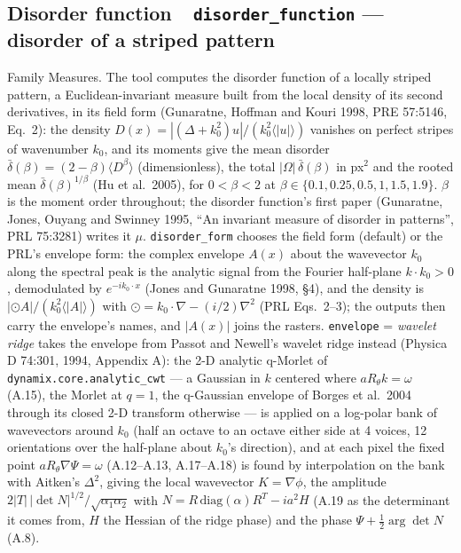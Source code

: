 \documentclass[10pt]{article}
\newcommand{\dev}[1]{\texttt{#1}}
\newcommand{\tool}[2]{#1~\textperiodcentered~\dev{#2}}
\begin{document}
\subsection{\tool{Disorder function}{disorder\_function} --- disorder of a striped pattern}\label{sec:disorder-function}
Family Measures. The tool computes the
disorder function of a locally striped pattern, a Euclidean-invariant measure built from the
local density of its second derivatives, in its field form
(Gunaratne, Hoffman and Kouri 1998, PRE 57:5146, Eq.~2): the density
$D(x) = |(\Delta + k_0^2)u| / (k_0^2 \langle|u|\rangle)$ vanishes on perfect stripes of wavenumber
$k_0$, and its moments give the mean disorder $\bar\delta(\beta) = (2-\beta)\langle D^\beta\rangle$
(dimensionless), the total $|\Omega|\,\bar\delta(\beta)$ in px$^2$ and the rooted mean
$\bar\delta(\beta)^{1/\beta}$ (Hu et al.\ 2005), for $0 < \beta < 2$ at
$\beta \in \{0.1, 0.25, 0.5, 1, 1.5, 1.9\}$. $\beta$ is the moment order
throughout; the disorder function's first paper (Gunaratne, Jones, Ouyang and Swinney 1995, ``An
invariant measure of disorder in patterns'', PRL 75:3281) writes it $\mu$. \texttt{disorder\_form} chooses the field form (default)
or the PRL's envelope form: the complex envelope $A(x)$ about the wavevector $k_0$ along the
spectral peak is the analytic signal from the Fourier half-plane $k\cdot k_0 > 0$, demodulated by
$e^{-ik_0\cdot x}$ (Jones and Gunaratne 1998, \S4), and the density is $|\odot A| / (k_0^2
\langle|A|\rangle)$ with $\odot = k_0\cdot\nabla - (i/2)\nabla^2$ (PRL Eqs.~2--3); the outputs then
carry the envelope's names, and $|A(x)|$ joins the rasters. \texttt{envelope} = \emph{wavelet
ridge} takes the envelope from Passot and Newell's wavelet ridge instead (Physica D 74:301, 1994,
Appendix A): the 2-D analytic q-Morlet of \texttt{dynamix.core.analytic\_cwt} --- a Gaussian in $k$
centered where $aR_\theta k = \omega$ (A.15), the Morlet at $q = 1$, the q-Gaussian envelope of
Borges et al.\ 2004 through its closed 2-D transform otherwise --- is applied on a log-polar bank
of wavevectors around $k_0$ (half an octave to an octave either side at 4 voices, 12 orientations
over the half-plane about $k_0$'s direction), and at each pixel the fixed point $aR_\theta\nabla\Psi
= \omega$ (A.12--A.13, A.17--A.18) is found by interpolation on the bank with Aitken's $\Delta^2$,
giving the local wavevector $K = \nabla\phi$, the amplitude $2|T|\,|\det N|^{1/2}/\sqrt{\alpha_1
\alpha_2}$ with $N = R\,\mathrm{diag}(\alpha)R^{T} - ia^2H$ (A.19 as the determinant it comes
from, $H$ the Hessian of the ridge phase) and the phase $\Psi + \tfrac12\arg\det N$ (A.8).
\end{document}
